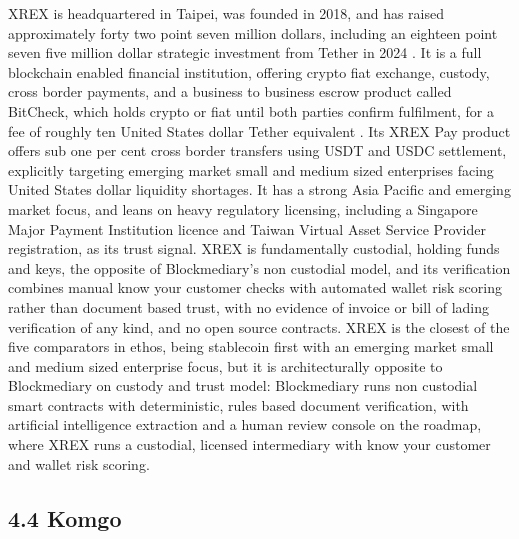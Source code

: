 \documentclass[12pt, a4paper]{article}
\begin{document}
XREX is headquartered in Taipei, was founded in 2018, and has raised approximately forty
two point seven million dollars, including an eighteen point seven five million dollar
strategic investment from Tether in 2024 \citep{xrextether2024}. It is a full blockchain
enabled financial institution, offering crypto fiat exchange, custody, cross border
payments, and a business to business escrow product called BitCheck, which holds crypto or
fiat until both parties confirm fulfilment, for a fee of roughly ten United States dollar
Tether equivalent \citep{xrexbitcheck}. Its XREX Pay product offers sub one per cent cross
border transfers using USDT and USDC settlement, explicitly targeting emerging market
small and medium sized enterprises facing United States dollar liquidity shortages. It has
a strong Asia Pacific and emerging market focus, and leans on heavy regulatory licensing,
including a Singapore Major Payment Institution licence and Taiwan Virtual Asset Service
Provider registration, as its trust signal. XREX is fundamentally custodial, holding funds
and keys, the opposite of Blockmediary's non custodial model, and its verification
combines manual know your customer checks with automated wallet risk scoring rather than
document based trust, with no evidence of invoice or bill of lading verification of any
kind, and no open source contracts. XREX is the closest of the five comparators in ethos,
being stablecoin first with an emerging market small and medium sized enterprise focus,
but it is architecturally opposite to Blockmediary on custody and trust model: Blockmediary
runs non custodial smart contracts with deterministic, rules based document verification,
with artificial intelligence extraction and a human review console on the roadmap, where
XREX runs a custodial, licensed intermediary with know your customer and wallet risk
scoring.

\subsection*{4.4 Komgo}
\end{document}
